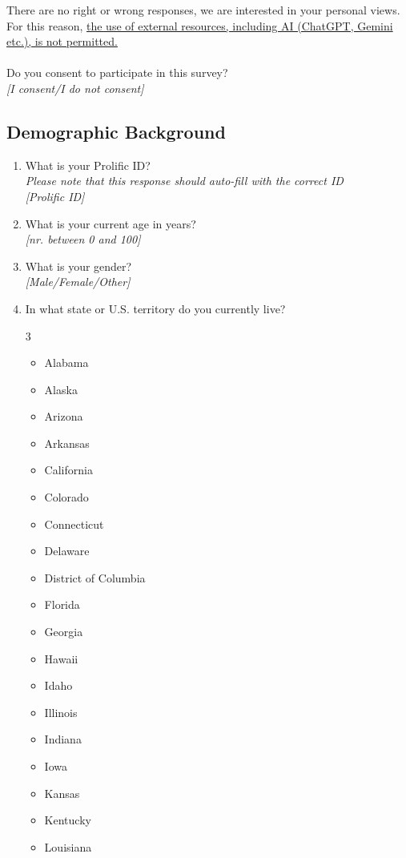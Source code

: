 \documentclass[11pt]{article}
\begin{document}
\noindent There are no right or wrong responses, we are interested in your personal views. For this reason, \uline{the use of external resources, including AI (ChatGPT, Gemini etc.), is not permitted.}
\\
\\
\noindent Do you consent to participate in this survey?\\
\textit{[I consent/I do not consent]}

\subsection*{Demographic Background}
\begin{enumerate}
    \item What is your Prolific ID? \\ \textit{Please note that this response should auto-fill with the correct ID}\\ \textit{[Prolific ID]}
    \item What is your current age in years? \\ \textit{[nr. between 0 and 100]}
    \item What is your gender? \\ \textit{[Male/Female/Other]} 
    \item In what state or U.S. territory do you currently live?  \\
\begin{multicols}{3} %
\begin{itemize}
\item Alabama
\item Alaska
\item Arizona
\item Arkansas
\item California
\item Colorado
\item Connecticut
\item Delaware
\item District of Columbia
\item Florida
\item Georgia
\item Hawaii
\item Idaho
\item Illinois
\item Indiana
\item Iowa
\item Kansas
\item Kentucky
\item Louisiana

\end{itemize}
\end{multicols}
\end{enumerate}
\end{document}
